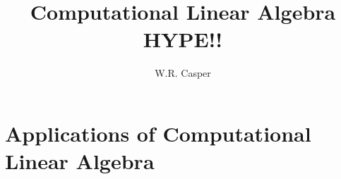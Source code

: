 \documentclass[handout]{beamer}
\title{Computational Linear Algebra HYPE!!}
\subtitle
{} %
\author[W.R. Casper] %
{W.R. Casper}
\institute[California State University Fullerton] %
{
  Department of Mathematics\\
  California State University Fullerton}
\begin{document}
\begin{frame}
  \titlepage
\end{frame}




\section{Applications of Computational Linear Algebra}
\end{document}
